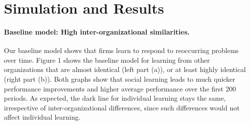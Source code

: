 \section*{Simulation and Results}

\paragraph*{Baseline model: High inter-organizational similarities. } Our baseline model shows that firms learn to respond to reoccurring problems over time. Figure 1 shows the baseline model for learning from other organizations that are almost identical (left part (a)), or at least highly identical (right part (b)). Both graphs show that social learning leads to much quicker performance improvements and higher average performance over the first 200 periods. As expected, the dark line for individual learning stays the same, irrespective of inter-organizational differences, since such differences would not affect individual learning.


